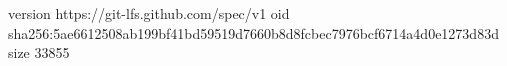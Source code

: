 version https://git-lfs.github.com/spec/v1
oid sha256:5ae6612508ab199bf41bd59519d7660b8d8fcbec7976bcf6714a4d0e1273d83d
size 33855
